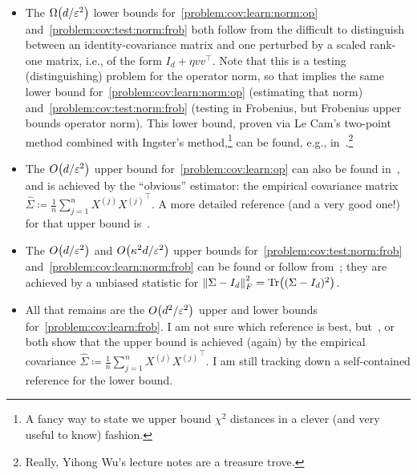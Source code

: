 \documentclass[10pt]{article}
\newcommand{\dst}{\varepsilon}
\newcommand{\ns}{n}
\newcommand{\dims}{d}
\renewcommand{\eqdef}{\coloneqq}
\theoremstyle{plain}
\begin{document}
\begin{itemize}
  \item
The $\bigOmega{\dims/\dst^2}$ lower bounds for~\autoref{problem:cov:learn:norm:op} and~\autoref{problem:cov:test:norm:frob} both follow from the difficult to distinguish between an identity-covariance matrix and one perturbed by a scaled rank-one matrix, i.e., of the form $I_\dims+\eta vv^\top$. Note that this is a testing (distinguishing) problem for the operator norm, so that implies the same lower bound for~\autoref{problem:cov:learn:norm:op} (estimating that norm) and~\autoref{problem:cov:test:norm:frob} (testing in Frobenius, but Frobenius upper bounds operator norm). This lower bound, proven via Le Cam's two-point method combined with Ingster's method,\footnote{A fancy way to state we upper bound $\chi^2$ distances in a clever (and very useful to know) fashion.} can be found, e.g., in~\cite[Section~24.2]{Wu17}.\footnote{Really, Yihong Wu's lecture notes are a treasure trove.}
  \item
The $\bigO{\dims/\dst^2}$ upper bound for~\autoref{problem:cov:learn:op} can also be found in~\cite[Section~24.2]{Wu17}, and is achieved by the ``obvious'' estimator: the empirical covariance matrix $\widehat{\Sigma}\eqdef \frac{1}{\ns}\sum_{j=1}^\ns X^{(j)}{X^{(j)}}^\top$. A more detailed reference (and a very good one!) for that upper bound is~\cite[Chapter~4.7]{Vershynin18}.
  \item
The $\bigO{\dims/\dst^2}$ and $\bigO{\kappa^2\dims/\dst^2}$ upper bounds for~\autoref{problem:cov:test:norm:frob} and~\autoref{problem:cov:learn:norm:frob} can be found or follow from~\cite{CaiM13}; they are achieved by a unbiased statistic for $\norm{\Sigma-I_\dims}_F^2 = \operatorname{Tr}\mleft((\Sigma-I_\dims)^2\mright)$.
  \item
  All that remains are the $\bigO{\dims^2/\dst^2}$ upper and lower bounds for~\autoref{problem:cov:learn:frob}. I am not sure which reference is best, but~\cite[Section~4.2.2]{DiakonikolasKKLMS16}, or~\cite[Corollary~2.1.12]{Li2018} both show that the upper bound is achieved (again) by the empirical covariance $\widehat{\Sigma}\eqdef \frac{1}{\ns}\sum_{j=1}^\ns X^{(j)}{X^{(j)}}^\top$. I am still tracking down a self-contained reference for the lower bound.
\end{itemize}
\end{document}
